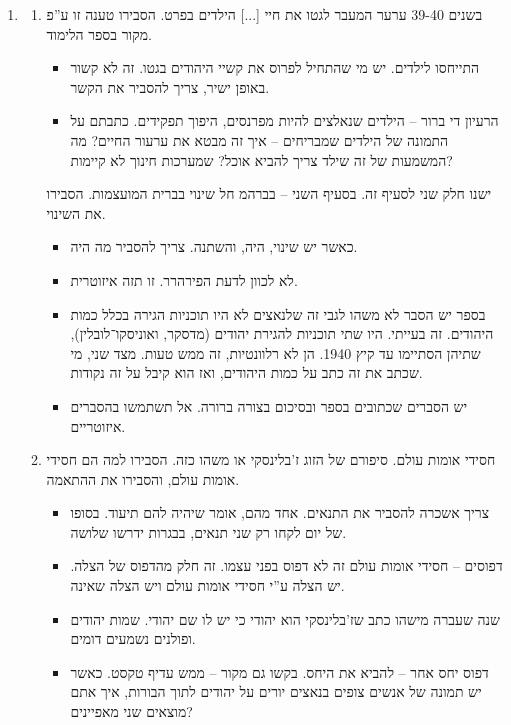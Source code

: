 \documentclass[]{../../../../tex/classes/styledArticle}
\begin{document}
\begin{enumerate}
\begin{itemize}
			יש ילדים שכתבו שההסבר הוא בזמנים – אין קשר. כל טקסט נכתב בשלב בו המדינה נכבשה. המדיניות נקבעת לפי המדרג הגזעי בסדר החדש. הדוגמה הפשוטה – כאשר לא־יהודים הצילו יהודים בפולין, לעומת הולנד, הענישה הייתה שונה לחלוטין. 
		\end{itemize}
		\item \begin{enumerate}[A']
			\item בשנים 39-40 ערער המעבר לגטו את חיי [...] הילדים בפרט. הסבירו טענה זו ע''פ מקור בספר הלימוד. 
			\begin{itemize}
				\item התייחסו לילדים. יש מי שהתחיל לפרוס את קשיי היהודים בגטו. זה לא קשור באופן ישיר, צריך להסביר את הקשר. 
				\item הרעיון די ברור – הילדים שנאלצים להיות מפרנסים, היפוך תפקידים. כתבתם על התמונה של הילדים שמבריחים – איך זה מבטא את ערעור החיים? מה המשמעות של זה שילד צריך להביא אוכל? שמערכות חינוך לא קיימות? 
			\end{itemize}
			ישנו חלק שני לסעיף זה. 
			בסעיף השני – בברהמ חל שינוי בברית המועצמות. הסבירו את השינוי. 
			\begin{itemize}
				\item כאשר יש שינוי, היה, והשתנה. צריך להסביר מה היה. 
				\item לא לכוון לדעת הפירהרר. זו תזה איזוטרית. 
				\item בספר יש הסבר לא משהו לגבי זה שלנאצים לא היו תוכניות הגירה בכלל כמות היהודים. זה בעייתי. היו שתי תוכניות להגירת יהודים (מדסקר, ואוניסקו־לובלין), שתיהן הסתיימו עד קיץ 1940. הן לא רלוונטיות, זה ממש טעות. מצד שני, מי שכתב את זה כתב על כמות היהודים, ואז הוא קיבל על זה נקודות. 
				\item יש הסברים שכתובים בספר ובסיכום בצורה ברורה. אל תשתמשו בהסברים איזוטריים. 
			\end{itemize}
			\item חסידי אומות עולם. סיפורם של הזוג ז'בלינסקי או משהו כזה. הסבירו למה הם חסידי אומות עולם, והסבירו את ההתאמה. 
			\begin{itemize}
				\item צריך אשכרה להסביר את התנאים. אחד מהם, אומר שיהיה להם תיעוד. בסופו של יום לקחו רק שני תנאים, בבגרות ידרשו שלושה. 
				\item דפוסים – חסידי אומות עולם זה לא דפוס בפני עצמו. זה חלק מהדפוס של הצלה. יש הצלה ע''י חסידי אומות עולם ויש הצלה שאינה. 
				\item שנה שעברה מישהו כתב שז'בלינסקי הוא יהודי כי יש לו שם יהודי. שמות יהודים ופולנים נשמעים דומים. 
				\item דפוס יחס אחר – להביא את היחס. בקשו גם מקור – ממש עדיף טקסט. כאשר יש תמונה של אנשים צופים בנאצים יורים על יהודים לתוך הבורות, איך אתם מוצאים שני מאפיינים? 

\end{itemize}
\end{enumerate}
\end{enumerate}
\end{document}
